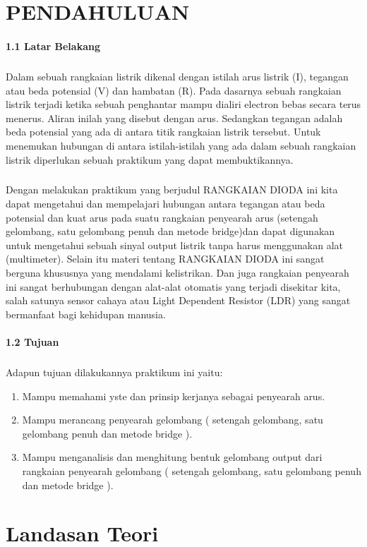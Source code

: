 \documentclass[12pt,a4paper]{article}
\begin{document}
\newpage
\section{PENDAHULUAN}
\paragraph{1.1 Latar Belakang}
\subparagraph{ }
	Dalam sebuah rangkaian listrik dikenal dengan istilah arus listrik (I), tegangan atau beda potensial (V) dan hambatan (R). Pada dasarnya sebuah rangkaian listrik terjadi ketika sebuah penghantar mampu dialiri electron bebas secara terus menerus. Aliran inilah yang disebut dengan arus. Sedangkan tegangan adalah beda potensial yang ada di antara titik rangkaian listrik tersebut. Untuk menemukan hubungan di antara istilah-istilah yang ada dalam sebuah rangkaian listrik diperlukan sebuah praktikum yang dapat membuktikannya.
\subparagraph{ }
	Dengan melakukan praktikum yang berjudul RANGKAIAN DIODA ini kita dapat mengetahui dan mempelajari hubungan antara tegangan atau beda potensial dan kuat arus pada suatu rangkaian penyearah arus (setengah gelombang, satu gelombang penuh dan metode bridge)dan dapat digunakan untuk mengetahui sebuah sinyal output listrik tanpa harus menggunakan alat (multimeter). Selain itu materi tentang RANGKAIAN DIODA ini sangat berguna khususnya yang mendalami kelistrikan. Dan juga rangkaian penyearah ini sangat berhubungan dengan alat-alat otomatis yang terjadi disekitar kita, salah satunya sensor cahaya atau Light Dependent Resistor (LDR) yang sangat bermanfaat bagi kehidupan manusia.
 

\paragraph{1.2 Tujuan}
\subparagraph{ }
Adapun tujuan dilakukannya praktikum ini yaitu:
\begin{enumerate}
\item Mampu memahami yste dan prinsip kerjanya sebagai penyearah arus.
\item Mampu merancang penyearah gelombang ( setengah gelombang, satu gelombang penuh dan metode bridge ).
\item Mampu menganalisis dan menghitung bentuk gelombang output dari rangkaian penyearah gelombang ( setengah gelombang, satu gelombang penuh dan metode bridge ).
\end{enumerate}


\newpage
\section{Landasan Teori}
\end{document}
